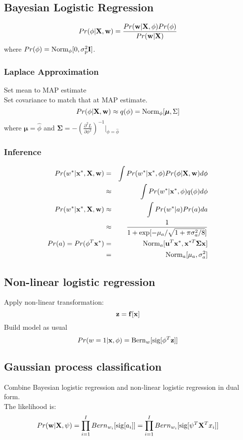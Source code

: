 \documentclass[12pt,a4paper]{article}
\begin{document}
\subsection*{Bayesian Logistic Regression}
$$
Pr(\phi|{\bf X,w}) =  \frac{Pr({\bf w|X},\phi)Pr(\phi)}{Pr({\bf w|X})}
$$
where $Pr(\phi) = {\rm Norm_{\phi}[0,\sigma_p^2{\bf I}]}$.
\subsubsection*{Laplace Approximation}
Set mean to MAP estimate \\
Set covariance to match that at MAP estimate.\\
$$
Pr(\phi|{\bf X,w}) \approx q(\phi) = {\rm Norm}_\phi[{\boldsymbol \mu, \Sigma}]
$$
where ${\boldsymbol \mu} = \hat\phi$ and $\boldsymbol \Sigma = -\left(\frac{\partial^2L}{\partial\phi^2}\right)^{-1}|_{\phi=\hat \phi}$\\
\subsubsection*{Inference}
\begin{eqnarray*}
Pr(w^*|{\bf x^*, X,w}) &=& \int Pr(w^*|{\bf x^*,\phi})Pr(\phi|{\bf X,w})d\phi\\
&\approx& \int Pr(w^*|{\bf x^*,\phi})q(\phi)d\phi \\
Pr(w^*|{\bf x^*,X,w}) &\approx& \int Pr(w^*|a)Pr(a)da\\
&\approx& \frac{1}{1+\exp[-\mu_a/\sqrt{1+\pi\sigma^2_a/8}]}\\
Pr(a) = Pr(\phi^T{\bf x}^*) &=& {\rm Norm} _a[{\bold u}^T{\bold x^*},{\bf x}^{*T}{\boldsymbol \Sigma}{\bf x}]\\
&=& {\rm Norm}_a[\mu_a,\sigma_a^2]
\end{eqnarray*}
\subsection*{Non-linear logistic regression}
Apply non-linear transformation:
$$
\bf z = f[x]
$$
Build model as usual
$$
Pr(w=1|{\bf x},\phi) = {\rm Bern}_w[{\rm sig}[\phi^T{\bf z}]]
$$
\subsection*{Gaussian process classification}
Combine Bayesian logistic regression and non-linear logistic regression in dual form.\\
The likelihood is:
$$
Pr({\bf w|X,\psi}) = \prod_{i=1}^{I} Bern_{w_i}[{\rm sig}[a_i]] = \prod_{i=1}^{I}Bern_{w_i}[{\rm sig}[\psi^T{\bf X}^Tx_i]]
$$
\end{document}
